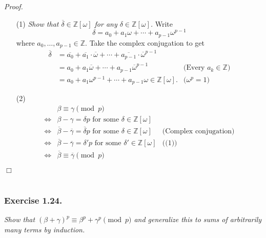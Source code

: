 \documentclass{article}
\begin{document}
\emph{Proof.}
\begin{enumerate}
\item[(1)]
\emph{Show that $\overline{\delta} \in \mathbb{Z}[\omega]$ for any
$\delta \in \mathbb{Z}[\omega]$. }
Write $$\delta = a_0 + a_1 \omega + \cdots + a_{p-1} \omega^{p-1}$$
where $a_0, \ldots, a_{p-1} \in \mathbb{Z}$.
Take the complex conjugation to get
\begin{align*}
\overline{\delta}
&= \overline{a_0} + \overline{a_1} \cdot \overline{\omega} + \cdots
  + \overline{a_{p-1}} \cdot \overline{\omega}^{p-1} \\
&= a_0 + a_1 \overline{\omega} + \cdots + a_{p-1} \overline{\omega}^{p-1}
  &\text{(Every $a_k \in \mathbb{Z}$)} \\
&= a_0 + a_1 \omega^{p-1} + \cdots + a_{p-1} \omega \in \mathbb{Z}[\omega].
  &\text{($\omega^p = 1$)}
\end{align*}
\item[(2)]
\begin{align*}
&\beta \equiv \gamma \pmod{p} \\
\Longleftrightarrow&
\beta - \gamma = \delta p \text{ for some } \delta \in \mathbb{Z}[\omega] \\
\Longleftrightarrow&
\overline{\beta} - \overline{\gamma}
= \overline{\delta} p \text{ for some } \delta \in \mathbb{Z}[\omega]
  &\text{(Complex conjugation)} \\
\Longleftrightarrow&
\overline{\beta} - \overline{\gamma}
= \delta' p \text{ for some } \delta' \in \mathbb{Z}[\omega]
  &\text{((1))} \\
\Longleftrightarrow&
\overline{\beta} \equiv \overline{\gamma} \pmod{p}
\end{align*}
\end{enumerate}
$\Box$ \\\\






\subsubsection*{Exercise 1.24.}
\emph{Show that
$(\beta+\gamma)^p \equiv \beta^p + \gamma^p \pmod{p}$
and generalize this to sums of arbitrarily many terms by induction. } \\
\end{document}
